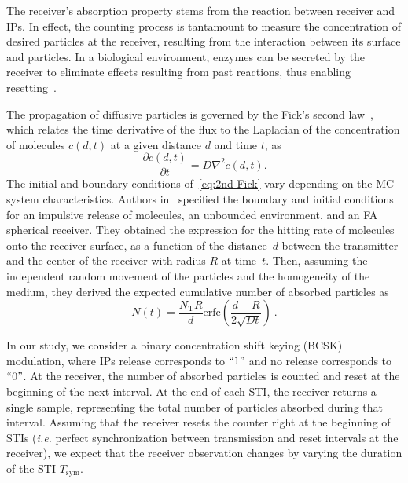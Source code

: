 \documentclass[journal]{IEEEtranTCOM}
\begin{document}
\par The receiver's absorption property stems from the reaction between receiver and IPs. In effect, the counting process is tantamount to measure the concentration of desired particles at the receiver, resulting from the interaction between its surface and particles. In a biological environment, enzymes can be secreted by the receiver to eliminate effects resulting from past reactions, thus enabling resetting~\cite{awan2017improving}.
\par The propagation of diffusive particles is governed by the Fick's second law~\cite{crank1975mathematics}, which relates the time derivative of the flux to the Laplacian of the concentration of molecules $c\left(d,t\right)$ at a given distance $d$ and time $t$, as
\begin{equation}
    \frac{\partial c \left( d,t \right)}{\partial t} = D \nabla^2c
    \left( d,t \right). \label{eq:2nd Fick}
\end{equation}
The initial and boundary conditions of~\eqref{eq:2nd Fick} vary depending on the MC system characteristics. Authors in~\cite{schulten2000lectures} specified the boundary and initial conditions for an impulsive release of molecules, an unbounded environment, and an FA spherical receiver. They obtained the expression for the hitting rate of molecules onto the receiver surface, as a function of the distance~$d$ between the transmitter and the center of the receiver with radius $R$ at time~$t$. Then, assuming the independent random movement of the particles and the homogeneity of the medium, they derived the expected cumulative number of absorbed particles as 
 \begin{equation}
 N(t) = \frac{N_{\mathrm{T}}R}{d} \mathrm{erfc}\left ( \frac{d-R}{2\sqrt{Dt}} \right )~.\label{eq:CNAP}
 \end{equation}
\par In our study, we consider a binary concentration shift keying (BCSK) modulation, where IPs release corresponds to $``1"$ and no release corresponds to $``0"$. At the receiver, the number of absorbed particles is counted and reset at the beginning of the next interval. At the end of each STI, the receiver returns a single sample, representing the total number of particles absorbed during that interval. Assuming that the receiver resets the counter right at the beginning of STIs (\textit{i.e.} perfect synchronization between transmission and reset intervals at the receiver), we expect that the receiver observation changes by varying the duration of the STI $T_{\mathrm{sym}}$. 
\end{document}
